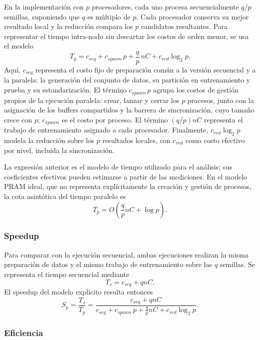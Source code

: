 \documentclass[11pt, a4paper]{article}
\begin{document}
En la implementación con $p$ procesadores, cada uno procesa secuencialmente $q/p$ semillas, suponiendo que $q$ es múltiplo de $p$. Cada procesador conserva su mejor resultado local y la reducción compara los $p$ candidatos resultantes. Para representar el tiempo intra-nodo sin descartar los costos de orden menor, se usa el modelo
\begin{equation}
T_p=c_{seq}+c_{spawn}\,p+\frac{q}{p}\,nC+c_{red}\log_2 p.
\label{eq:tp_explicito}
\end{equation}
Aquí, $c_{seq}$ representa el costo fijo de preparación común a la versión secuencial y a la paralela: la generación del conjunto de datos, su partición en entrenamiento y prueba y su estandarización. El término $c_{spawn}\,p$ agrupa los costos de gestión propios de la ejecución paralela: crear, lanzar y cerrar los $p$ procesos, junto con la asignación de los buffers compartidos y la barrera de sincronización, cuyo tamaño crece con $p$; $c_{spawn}$ es el costo por proceso. El término $(q/p)nC$ representa el trabajo de entrenamiento asignado a cada procesador. Finalmente, $c_{red}\log_2 p$ modela la reducción sobre los $p$ resultados locales, con $c_{red}$ como costo efectivo por nivel, incluida la sincronización.

La expresión anterior es el modelo de tiempo utilizado para el análisis; sus coeficientes efectivos pueden estimarse a partir de las mediciones. En el modelo PRAM ideal, que no representa explícitamente la creación y gestión de procesos, la cota asintótica del tiempo paralelo es
\[
T_p=O\left(\frac{q}{p}nC+\log p\right).
\]

\subsubsection{Speedup}

Para comparar con la ejecución secuencial, ambas ejecuciones realizan la misma preparación de datos y el mismo trabajo de entrenamiento sobre las $q$ semillas. Se representa el tiempo secuencial mediante
\[
T_s=c_{seq}+qnC.
\]
El speedup del modelo explícito resulta entonces
\begin{equation}
S_p=\frac{T_s}{T_p}
 =\frac{c_{seq}+qnC}
 {c_{seq}+c_{spawn}\,p+\frac{q}{p}nC+c_{red}\log_2 p}.
\label{eq:speedup}
\end{equation}


\subsubsection{Eficiencia}
\end{document}
